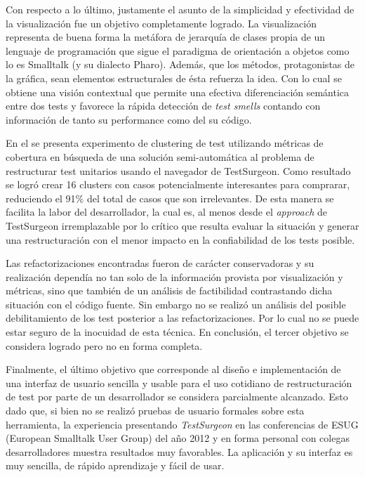 \par Con respecto a lo último, justamente el asunto de la simplicidad y efectividad de la visualización fue un objetivo completamente logrado. La visualización representa de buena forma la metáfora de jerarquía de clases propia de un lenguaje de programación que sigue el paradigma de orientación a objetos como lo es Smalltalk (y su dialecto Pharo). Además, que los métodos, protagonistas de la gráfica, sean elementos estructurales de ésta refuerza la idea. Con lo cual se obtiene una visión contextual que permite una efectiva diferenciación semántica entre dos tests y favorece la rápida detección de \emph{test smells} contando con información de tanto su performance como del su código.

\par En el  se presenta experimento de clustering de test utilizando métricas de cobertura en búsqueda de una solución semi-automática al problema de restructurar test unitarios usando el navegador de TestSurgeon. Como resultado se logró crear 16 clusters con casos potencialmente interesantes para comprarar, reduciendo el 91\% del total de casos que son irrelevantes. De esta manera se facilita la labor del desarrollador, la cual es, al menos desde el \emph{approach} de TestSurgeon irremplazable por lo crítico que resulta evaluar la situación y generar una restructuración con el menor impacto en la confiabilidad de los tests posible.

\par Las refactorizaciones encontradas fueron de carácter conservadoras y su realización dependía no tan solo de la información provista por visualización y métricas, sino que también de un análisis de factibilidad contrastando dicha situación con el código fuente. Sin embargo no se realizó un análisis del posible debilitamiento de los test posterior a las refactorizaciones. Por lo cual no se puede estar seguro de la inocuidad de esta técnica. En conclusión, el tercer objetivo se considera logrado pero no en forma completa.

\par Finalmente, el último objetivo que corresponde al diseño e implementación de una interfaz de usuario sencilla y usable para el uso cotidiano de restructuración de test por parte de un desarrollador se considera parcialmente alcanzado. Esto dado que, si bien no se realizó pruebas de usuario formales sobre esta herramienta, la experiencia presentando \emph{TestSurgeon} en las conferencias de ESUG (European Smalltalk User Group) del año 2012 y en forma personal con colegas desarrolladores muestra resultados muy favorables. La aplicación y su interfaz es muy sencilla, de rápido aprendizaje y fácil de usar.

